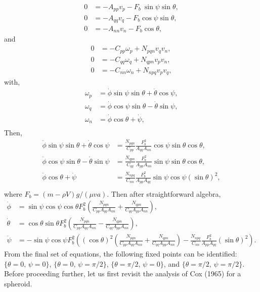 \documentclass[12pt]{My_preprint}
\begin{document}
\begin{align}
    0 &= -A_{pp} v_p - F_b\ \sin \psi \sin \theta, \label{eq:vp}\\
    0 &= -A_{qq} v_q - F_b\cos \psi \sin \theta,
\label{eq:vq} \\
   0 &= -A_{nn} v_n - F_b\cos \theta,
\label{eq:vn}
\end{align}
and
\begin{align}
    0 &= -C_{pp} \omega_p + N_{pqn} v_q v_n, \label{eq:omp}\\
    0 &= -C_{qq} \omega_q + N_{qpn} v_p v_n, \label{eq:omq} \\
   0 &= -C_{nn} \omega_n + N_{npq} v_p v_q,\label{eq:omn}
\end{align}
with,
\begin{align}
    \omega_p &= \dot \phi \sin \psi \sin \theta +  \dot \theta \cos \psi, \\
    \omega_q &= \dot \phi \cos \psi \sin \theta -  \dot \theta \sin \psi, \\
    \omega_n &= \dot \phi \cos \theta +  \dot \psi, \\
\end{align}
Then,
\begin{align}
    \dot \phi \sin \psi \sin \theta +  \dot \theta \cos \psi &= \frac{N_{pqn}}{C_{pp}} \frac{F_b^2}{A_{qq} A_{nn}}\cos \psi \sin \theta\cos \theta, \\
    \dot \phi \cos \psi \sin \theta -  \dot \theta \sin \psi &= \frac{N_{qpn}}{C_{qq}} \frac{F_b^2}{A_{pp} A_{nn}}\sin \psi \sin \theta\cos \theta, \\
    \dot \phi \cos \theta +  \dot \psi &= \frac{N_{npq}}{C_{nn}}\frac{F_b^2}{A_{pp} A_{qq}}\sin \psi \cos \psi (\sin \theta) ^2,\\
\end{align}
where $F_b = (m-\rho V)g/(\mu v a)$.
Then after straightforward algebra,
\begin{align}
    \dot \phi  &= \sin \psi \cos \psi  \cos \theta F_b^2 \left(\frac{N_{pqn}}{C_{pp}A_{qq} A_{nn}}+\frac{N_{qpn}}{C_{qq}A_{pp} A_{nn}}\right), \\
    \dot \theta  &= \cos \theta \sin \theta F_b^2 \left(\frac{N_{pqn}}{C_{pp}A_{qq} A_{nn}} - \frac{N_{qpn}}{C_{qq}A_{pp} A_{nn}}\right), \\
    \dot \psi   &= -\sin \psi \cos \psi F_b^2 \left((\cos \theta)^2\left(\frac{N_{pqn}}{C_{pp}A_{qq} A_{nn}}+\frac{N_{qpn}}{C_{qq}A_{pp} A_{nn}}\right)-\frac{N_{npq}}{C_{nn}}\frac{F_b^2}{A_{pp} A_{qq}}(\sin \theta) ^2\right).
\end{align}
From the final set of equations, the following fixed points can be identified:
$\{\theta = 0, \, \psi = 0\}$, $\{\theta = 0, \, \psi = \pi/2\}$, $\{\theta = \pi/2, \, \psi = 0\}$, and $\{\theta = \pi/2, \, \psi = \pi/2\}$.
Before proceeding further, let us first revisit the analysis of Cox (1965) for a spheroid.
\end{document}
